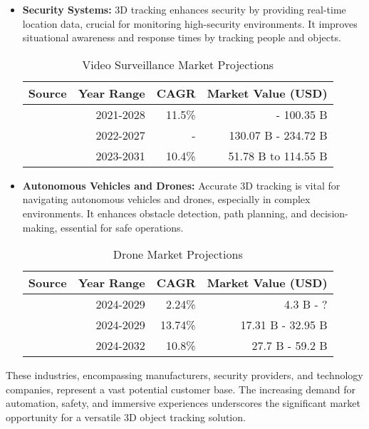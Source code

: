 \begin{itemize}
	\item \textbf{Security Systems:} 3D tracking enhances security by providing real-time location data, crucial for monitoring high-security environments. It improves situational awareness and response times by tracking people and objects.
	
	\begin{table}[H]
		\centering
		\label{table:security}
		\begin{tabular}{lrrr}
			\hline\hline
			\textbf{Source} & \textbf{Year Range} & \textbf{CAGR} & \textbf{Market Value (USD)} \\
			\hline
			\cite{databridgemarketresearch} & 2021-2028 & 11.5\% &  - 100.35 B \\
			\cite{statista_security} & 2022-2027 & - & 130.07 B - 234.72 B \\
			\cite{theinsightpartners_security} & 2023-2031 & 10.4\% & 51.78 B to 114.55 B \\
			\hline
		\end{tabular}
		\caption{Video Surveillance Market Projections}
	\end{table}
	
	\item \textbf{Autonomous Vehicles and Drones:} Accurate 3D tracking is vital for navigating autonomous vehicles and drones, especially in complex environments. It enhances obstacle detection, path planning, and decision-making, essential for safe operations.
	
	\begin{table}[H]
		\centering
		\label{table:drones}
		\begin{tabular}{lrrr}
			\hline\hline
			\textbf{Source} & \textbf{Year Range} & \textbf{CAGR} & \textbf{Market Value (USD)} \\
			\hline
			\cite{statista_drones} & 2024-2029 & 2.24\% & 4.3 B - ? \\
			\cite{mordorintelligence_drones} & 2024-2029 & 13.74\% & 17.31 B - 32.95 B\\
			\cite{expertmarketresearch} & 2024-2032 & 10.8\% & 27.7 B - 59.2 B\\
			\hline
		\end{tabular}
		\caption{Drone Market Projections}
	\end{table}
	
\end{itemize}

These industries, encompassing manufacturers, security providers, and technology companies, represent a vast potential customer base. The increasing demand for automation, safety, and immersive experiences underscores the significant market opportunity for a versatile 3D object tracking solution.

